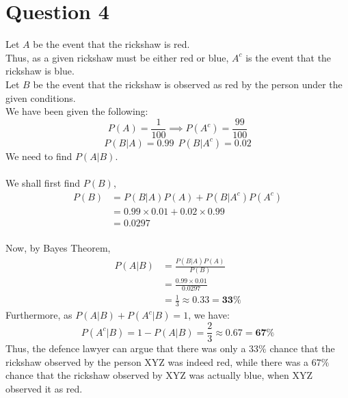 \documentclass[11pt]{article}
\begin{document}
\newpage
\section*{Question 4}
\setcounter{equation}{0}
Let $A$ be the event that the rickshaw is red.\\
Thus, as a given rickshaw must be either red or blue, $A^c$ is the event that the rickshaw is blue.\\
Let $B$ be the event that the rickshaw is observed as red by the person under the given conditions.\\
We have been given the following:
$$
    P(A) = \frac{1}{100} \implies P(A^c) = \frac{99}{100}
$$
$$
    P(B|A) = 0.99 \ \  P(B|A^c) = 0.02
$$
We need to find $P(A|B)$. \\
\\
We shall first find $P(B)$,
$$
    \begin{aligned}
        P(B) & = P(B|A)P(A) + P(B|A^c)P(A^c)     \\
             & = 0.99\times0.01 + 0.02\times0.99 \\
             & = 0.0297
    \end{aligned}
$$
\\
Now, by Bayes Theorem,
$$
    \begin{aligned}
        P(A|B) & = \frac{P(B|A)P(A)}{P(B)}            \\
               & = \frac{0.99\times0.01}{0.0297}      \\
               & = \frac{1}{3} \approx 0.33 = \mathbf{33\%}
    \end{aligned}
$$
Furthermore, as $P(A|B) + P(A^c|B) = 1$, we have: $$ P(A^c|B) = 1 - P(A|B) = \frac{2}{3} \approx 0.67 = \mathbf{67\%}$$
Thus, the defence lawyer can argue that there was only a $33\%$ chance that the rickshaw observed by the person XYZ was indeed red, while there was a $67\%$ chance that the rickshaw observed by XYZ was actually blue, when XYZ observed it as red.\\



\newpage
\end{document}
